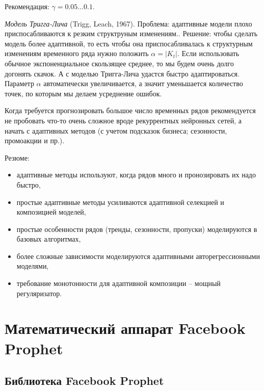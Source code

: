\documentclass[%
	11pt,
	a4paper,
	utf8,
		]{article}
\begin{document}
Рекомендация: $ \gamma = 0.05 \ldots 0.1 $.

\emph{Модель Тригга-Лича} (Trigg, Leach, 1967). {\color{red}Проблема: адаптивные модели плохо приспосабливаются к резким структруным изменениям.}. Решение: чтобы сделать модель более адаптивной, то есть чтобы она приспосабливалась к структурным изменениям временного ряда нужно положить $ \alpha = |K_t| $. Если использовать обычное экспоненциальное скользящее среднее, то мы будем очень долго догонять скачок. А с моделью Тригга-Лича удастся быстро адаптироваться. Параметр $ \alpha $ автоматически увеличивается, а значит уменьшается количество точек, по которым мы делаем  усреднение ошибок.

Когда требуется прогнозировать большое число временных рядов рекомендуется не пробовать что-то очень сложное вроде рекуррентных нейронных сетей, а начать с адаптивных методов (с учетом подсказок бизнеса; сезонности, промоакции и пр.).

Резюме:
\begin{itemize}
	\item адаптивные методы используют, когда рядов много и пронозировать их надо быстро,
	
	\item простые адаптивные методы усиливаются адаптивной селекцией и композицией моделей,
	
	\item простые особенности рядов (тренды, сезонности, пропуски) моделируются в базовых алгоритмах,
	
	\item более сложные зависимости моделируются адаптивными авторегрессионными моделями,
	
	\item требование монотонности для адаптивной композиции -- мощный регуляризатор.
\end{itemize}











\section{Математический аппарат Facebook Prophet}

\subsection{Библиотека Facebook Prophet}
\end{document}
